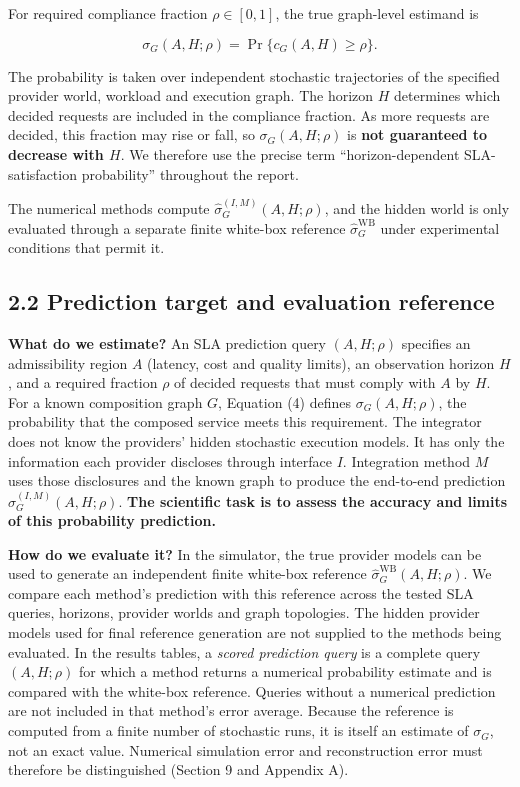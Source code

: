 \documentclass[10pt,a4paper]{article}
\begin{document}
For required compliance fraction $\rho\in[0,1]$, the true graph-level estimand is

\begin{equation*}
\boxed{\sigma_G(A,H;\rho)=\Pr\{c_G(A,H)\ge\rho\}.}
\tag{4}
\end{equation*}

The probability is taken over independent stochastic trajectories of the specified provider world, workload and execution graph. The horizon $H$ determines which decided requests are included in the compliance fraction. As more requests are decided, this fraction may rise or fall, so $\sigma_G(A,H;\rho)$ is \textbf{not guaranteed to decrease with $H$}. We therefore use the precise term “horizon-dependent SLA-satisfaction probability” throughout the report.

The numerical methods compute $\widehat\sigma_G^{(I,M)}(A,H;\rho)$, and the hidden world is only evaluated through a separate finite white-box reference $\widehat\sigma_G^{\mathrm{WB}}$ under experimental conditions that permit it.

\subsection*{2.2 Prediction target and evaluation reference}
\label{sec:prediction-target}

\textbf{What do we estimate?} An SLA prediction query $(A,H;\rho)$ specifies an admissibility region $A$ (latency, cost and quality limits), an observation horizon $H$, and a required fraction $\rho$ of decided requests that must comply with $A$ by $H$. For a known composition graph $G$, Equation (4) defines $\sigma_G(A,H;\rho)$, the probability that the composed service meets this requirement. The integrator does not know the providers' hidden stochastic execution models. It has only the information each provider discloses through interface $I$. Integration method $M$ uses those disclosures and the known graph to produce the end-to-end prediction $\widehat\sigma_G^{(I,M)}(A,H;\rho)$. \textbf{The scientific task is to assess the accuracy and limits of this probability prediction.}

\textbf{How do we evaluate it?} In the simulator, the true provider models can be used to generate an independent finite white-box reference $\widehat\sigma_G^{\mathrm{WB}}(A,H;\rho)$. We compare each method's prediction with this reference across the tested SLA queries, horizons, provider worlds and graph topologies. The hidden provider models used for final reference generation are not supplied to the methods being evaluated. In the results tables, a \emph{scored prediction query} is a complete query $(A,H;\rho)$ for which a method returns a numerical probability estimate and is compared with the white-box reference. Queries without a numerical prediction are not included in that method's error average. Because the reference is computed from a finite number of stochastic runs, it is itself an estimate of $\sigma_G$, not an exact value. Numerical simulation error and reconstruction error must therefore be distinguished (Section 9 and Appendix A).
\end{document}
